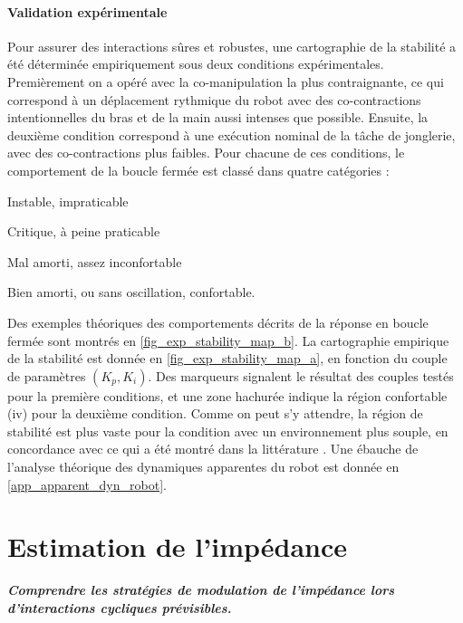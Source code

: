 \documentclass[12pt, a4paper]{article} %
\numberwithin{equation}{section}
\begin{document}
\paragraph{Validation expérimentale}

Pour assurer des interactions sûres et robustes, une cartographie de la stabilité a été déterminée empiriquement sous deux conditions expérimentales. Premièrement on a opéré avec la co-manipulation la plus contraignante, ce qui correspond à un déplacement rythmique du robot avec des co-contractions intentionnelles du bras et de la main aussi intenses que possible. Ensuite, la deuxième condition correspond à une exécution nominal de la tâche de jonglerie, avec des co-contractions plus faibles. Pour chacune de ces conditions, le comportement de la boucle fermée est classé dans quatre catégories : 
\begin{enumerate*} [label=\roman*),itemjoin={,\quad}]
	\item Instable, impraticable
	\item Critique, à peine praticable 
	\item Mal amorti, assez inconfortable
	\item Bien amorti, ou sans oscillation, confortable.
\end{enumerate*}
%
\newlineBlank
%
Des exemples théoriques des comportements décrits de la réponse en boucle fermée sont montrés en \cref{fig_exp_stability_map_b}. La cartographie empirique de la stabilité est donnée en \cref{fig_exp_stability_map_a}, en fonction du couple de paramètres $ (K_p, K_i) $. Des marqueurs signalent le résultat des couples testés pour la première conditions, et une zone hachurée indique la région confortable (iv) pour la deuxième condition. Comme on peut s'y attendre, la région de stabilité est plus vaste pour la condition avec un environnement plus souple, en concordance avec ce qui a été montré dans la littérature \cite{ott_unified_2010,keemink_admittance_2018}. 
%
\newlineBlank
%
Une ébauche de l'analyse théorique des dynamiques apparentes du robot est donnée en \cref{app_apparent_dyn_robot}.



\section{Estimation de l'impédance} \label{sec_impedance_estimation}

\begin{flushright}
	{\color{DarkGoldenrod} \textit{\textbf{Comprendre les stratégies de modulation de l'impédance lors d'interactions cycliques prévisibles.}}}
\end{flushright}
\end{document}
